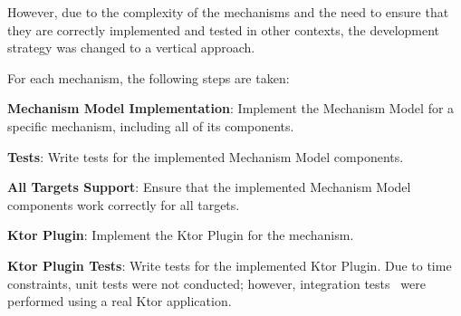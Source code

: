 However, due to the complexity of the mechanisms and the need to ensure that they are correctly implemented and tested
in other contexts, the development strategy was changed to a vertical approach.

For each mechanism, the following steps are taken:
\begin{boldenumerate}[topsep=0pt,itemsep=0pt,partopsep=0pt, parsep=0pt]
    \item \textbf{Mechanism Model Implementation}: Implement the Mechanism Model for a specific mechanism, including all of its components.
    \item \textbf{Tests}: Write tests for the implemented Mechanism Model components.
    \item \textbf{All Targets Support}: Ensure that the implemented Mechanism Model components work correctly for all targets.
    \item \textbf{Ktor Plugin}: Implement the Ktor Plugin for the mechanism.
    \item \textbf{Ktor Plugin Tests}: Write tests for the implemented Ktor Plugin.
    Due to time constraints, unit tests were not conducted; however, integration tests~\cite{software-test-types} were performed using a real Ktor application.
\end{boldenumerate}

